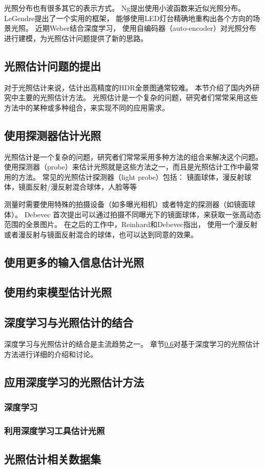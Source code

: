 光照分布也有很多其它的表示方式。
Ng\cite{ng2003all}提出使用小波函数来近似光照分布。
LeGendre\cite{legendre2016practical}提出了一个实用的框架，
能够使用LED灯台精确地重构出各个方向的场景光照。
近期Weber\cite{weber2018learning}结合深度学习，
使用自编码器（auto-encoder）对光照分布进行建模，为光照估计问题提供了新的思路。

\subsection{光照估计问题的提出}
对于光照估计来说，估计出高精度的HDR全景图通常较难。
本节介绍了国内外研究中主要的光照估计方法。
光照估计是一个复杂的问题，研究者们常常采用这些方法中的某种或多种组合，来实现不同的应用需求。

\subsection{使用探测器估计光照}
光照估计是一个复杂的问题，研究者们常常采用多种方法的组合来解决这个问题。
使用探测器（probe）来估计光照就是这些方法之一，而且是光照估计工作中最常用的方法。
常见的光照估计探测器（light probe）包括：
镜面球体，漫反射球体，镜面反射/漫反射混合球体，人脸等等

测量时需要使用特殊的拍摄设备（如多曝光相机）或者特定的探测器（如镜面球体）。
Debevec\cite{debevec1998rendering}
首次提出可以通过拍摄不同曝光下的镜面球体，来获取一张高动态范围的全景图片。
在之后的工作中，Reinhard\cite{reinhard2010high}和Debevec\cite{debevec2012single}指出，
使用一个漫反射或者漫反射与镜面反射混合的球体，也可以达到同意的效果。
\subsection{使用更多的输入信息估计光照}
\subsection{使用约束模型估计光照}
\subsection{深度学习与光照估计的结合}
深度学习与光照估计的结合是主流趋势之一。
章节\ref{sec:learning-based-estimation}对基于深度学习的光照估计方法进行详细的介绍和讨论。

\subsection{应用深度学习的光照估计方法}
\label{sec:learning-based-estimation}
\subsubsection{深度学习}
\subsubsection{利用深度学习工具估计光照}
\subsection{光照估计相关数据集}